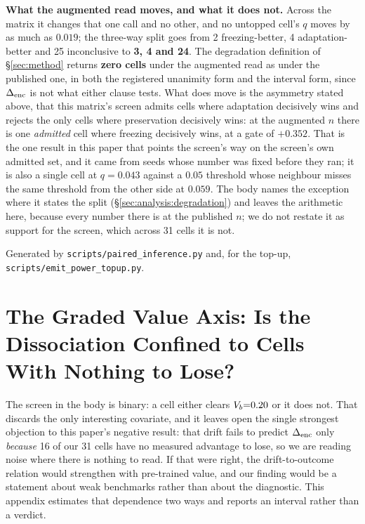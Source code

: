 \textbf{What the augmented read moves, and what it does not.}  Across the matrix it
changes that one call and no other, and no untopped cell's $q$ moves by as much as
$0.019$; the three-way split goes from 2 freezing-better, 4 adaptation-better and 25
inconclusive to \textbf{3, 4 and 24}.  The degradation definition of
\S\ref{sec:method} returns \textbf{zero cells} under the augmented read as under the
published one, in both the registered unanimity form and the interval form, since
$\Delta_\text{enc}$ is not what either clause tests.  What does move is the asymmetry stated
above, that this matrix's screen admits cells where adaptation decisively wins and
rejects the only cells where preservation decisively wins: at the augmented $n$ there
is one \emph{admitted} cell where freezing decisively wins, at a gate of $+0.352$.
That is the one result in this paper that points the screen's way on the screen's own
admitted set, and it came from seeds whose number was fixed before they ran; it is
also a single cell at $q{=}0.043$ against a $0.05$ threshold whose neighbour misses
the same threshold from the other side at $0.059$.  The body names the exception
where it states the split (\S\ref{sec:analysis:degradation}) and leaves the
arithmetic here, because every number there is at the published $n$; we do not
restate it as support for the screen, which across 31 cells it is not.

Generated by \texttt{scripts/paired\_inference.py} and, for the top-up,
\texttt{scripts/emit\_power\_topup.py}.

\clearpage
\section{The Graded Value Axis: Is the Dissociation Confined to Cells With Nothing
to Lose?}
\label{app:valueaxis}

The screen in the body is binary: a cell either clears $V_{b}{=}0.20$ or
it does not.  That discards the only interesting covariate, and it leaves open the
single strongest objection to this paper's negative result: that drift fails to
predict $\Delta_\text{enc}$ only \emph{because} 16 of our 31 cells have no measured advantage
to lose, so we are reading noise where there is nothing to read.  If that were
right, the drift-to-outcome relation would strengthen with pre-trained value, and
our finding would be a statement about weak benchmarks rather than about the
diagnostic.  This appendix estimates that dependence two ways and reports an
interval rather than a verdict.


